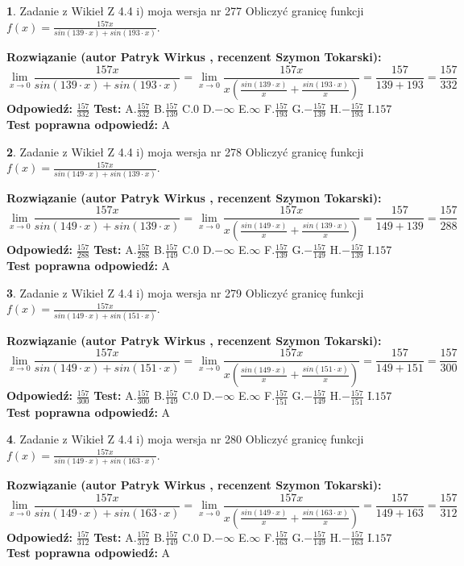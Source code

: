 \documentclass[12pt, a4paper]{article}
\theoremstyle{definition} %
\newtheorem{zad}{}
\newcommand{\zadStart}[1]{\begin{zad}#1\newline}
\newcommand{\zadStop}{\end{zad}}
\newcommand{\rozwStart}[2]{\noindent \textbf{Rozwiązanie (autor #1 , recenzent #2): }\newline}
\newcommand{\rozwStop}{\newline}
\newcommand{\odpStart}{\noindent \textbf{Odpowiedź:}\newline}
\newcommand{\odpStop}{\newline}
\newcommand{\testStart}{\noindent \textbf{Test:}\newline}
\newcommand{\testStop}{\newline}
\newcommand{\kluczStart}{\noindent \textbf{Test poprawna odpowiedź:}\newline}
\newcommand{\kluczStop}{\newline}
\begin{document}
\zadStart{Zadanie z Wikieł Z 4.4 i) moja wersja nr 277}
Obliczyć granicę funkcji $f(x)=\frac{157x}{sin(139\cdot x) +sin(193\cdot x)}$.
\zadStop
\rozwStart{Patryk Wirkus}{Szymon Tokarski}
$$\lim\limits_{x\to 0}\frac{157x}{sin(139\cdot x) +sin(193\cdot x)}=\lim\limits_{x\to 0}\frac{157x}{x(\frac{sin(139\cdot x)}{x}+\frac{sin(193\cdot x)}{x})}=\frac{157}{139+193} = \frac{157}{332}$$
\rozwStop
\odpStart
$\frac{157}{332}$
\odpStop
\testStart
A.$\frac{157}{332}$
B.$\frac{157}{139}$
C.$0$
D.$-\infty$
E.$\infty$
F.$\frac{157}{193}$
G.$-\frac{157}{139}$
H.$-\frac{157}{193}$
I.$157$
\testStop
\kluczStart
A
\kluczStop



\zadStart{Zadanie z Wikieł Z 4.4 i) moja wersja nr 278}
Obliczyć granicę funkcji $f(x)=\frac{157x}{sin(149\cdot x) +sin(139\cdot x)}$.
\zadStop
\rozwStart{Patryk Wirkus}{Szymon Tokarski}
$$\lim\limits_{x\to 0}\frac{157x}{sin(149\cdot x) +sin(139\cdot x)}=\lim\limits_{x\to 0}\frac{157x}{x(\frac{sin(149\cdot x)}{x}+\frac{sin(139\cdot x)}{x})}=\frac{157}{149+139} = \frac{157}{288}$$
\rozwStop
\odpStart
$\frac{157}{288}$
\odpStop
\testStart
A.$\frac{157}{288}$
B.$\frac{157}{149}$
C.$0$
D.$-\infty$
E.$\infty$
F.$\frac{157}{139}$
G.$-\frac{157}{149}$
H.$-\frac{157}{139}$
I.$157$
\testStop
\kluczStart
A
\kluczStop



\zadStart{Zadanie z Wikieł Z 4.4 i) moja wersja nr 279}
Obliczyć granicę funkcji $f(x)=\frac{157x}{sin(149\cdot x) +sin(151\cdot x)}$.
\zadStop
\rozwStart{Patryk Wirkus}{Szymon Tokarski}
$$\lim\limits_{x\to 0}\frac{157x}{sin(149\cdot x) +sin(151\cdot x)}=\lim\limits_{x\to 0}\frac{157x}{x(\frac{sin(149\cdot x)}{x}+\frac{sin(151\cdot x)}{x})}=\frac{157}{149+151} = \frac{157}{300}$$
\rozwStop
\odpStart
$\frac{157}{300}$
\odpStop
\testStart
A.$\frac{157}{300}$
B.$\frac{157}{149}$
C.$0$
D.$-\infty$
E.$\infty$
F.$\frac{157}{151}$
G.$-\frac{157}{149}$
H.$-\frac{157}{151}$
I.$157$
\testStop
\kluczStart
A
\kluczStop



\zadStart{Zadanie z Wikieł Z 4.4 i) moja wersja nr 280}
Obliczyć granicę funkcji $f(x)=\frac{157x}{sin(149\cdot x) +sin(163\cdot x)}$.
\zadStop
\rozwStart{Patryk Wirkus}{Szymon Tokarski}
$$\lim\limits_{x\to 0}\frac{157x}{sin(149\cdot x) +sin(163\cdot x)}=\lim\limits_{x\to 0}\frac{157x}{x(\frac{sin(149\cdot x)}{x}+\frac{sin(163\cdot x)}{x})}=\frac{157}{149+163} = \frac{157}{312}$$
\rozwStop
\odpStart
$\frac{157}{312}$
\odpStop
\testStart
A.$\frac{157}{312}$
B.$\frac{157}{149}$
C.$0$
D.$-\infty$
E.$\infty$
F.$\frac{157}{163}$
G.$-\frac{157}{149}$
H.$-\frac{157}{163}$
I.$157$
\testStop
\kluczStart
A
\kluczStop
\end{document}
